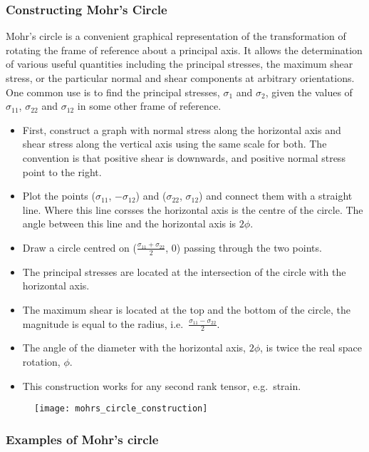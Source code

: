 \subsubsection{Constructing Mohr's Circle}

Mohr's circle is a convenient graphical representation of the transformation of rotating the frame of reference about a principal axis. It allows the determination of various useful quantities including the principal stresses, the maximum shear stress, or the particular normal and shear components at arbitrary orientations. One common use is to find the principal stresses, $\sigma_1$ and $\sigma_2$, given the values of $\sigma_{11}$, $\sigma_{22}$ and $\sigma_{12}$ in some other frame of reference.

\begin{itemize}
\item First, construct a graph with normal stress along the horizontal axis and shear stress along the vertical axis using the same scale for both. The convention is that positive shear is downwards, and positive normal stress point to the right.

\item Plot the points ($\sigma_{11}$, $-\sigma_{12}$) and ($\sigma_{22}$, $\sigma_{12}$) and connect them with a straight line. Where this line corsses the horizontal axis is the centre of the circle. The angle between this line and the horizontal axis is $2\phi$.

\item Draw a circle centred on ($\frac{\sigma_{11} + \sigma_{22}}{2}$, $0$) passing through the two points.
\item The principal stresses are located at the intersection of the circle with the horizontal axis. 
\item The maximum shear is located at the top and the bottom of the circle, the magnitude is equal to the radius, i.e.\ $\frac{\sigma_{11} - \sigma_{22}}{2}$.
\item The angle of the diameter with the horizontal axis, $2\phi$, is twice the real space rotation, $\phi$.
\item This construction works for any second rank tensor, e.g.\ strain.
\end{itemize}

\begin{figure}
\centering
\texttt{[image: mohrs\_circle\_construction]}
\end{figure}

\subsubsection{Examples of Mohr's circle}

